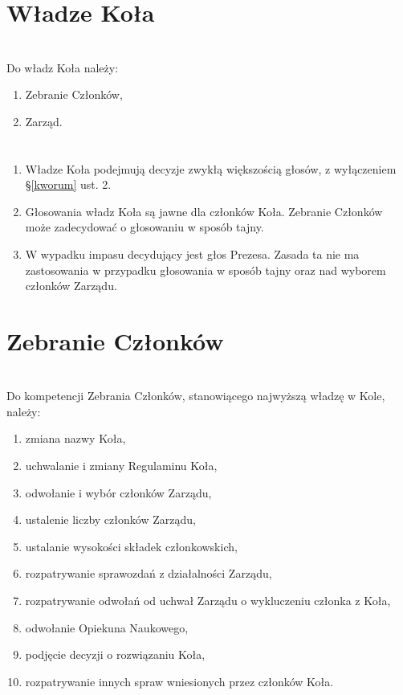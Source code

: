 \section*{Władze Koła~~~}
\section{}
Do władz Koła należy:
\begin{enumerate}[label=\alph*)]
\item Zebranie Członków,
\item Zarząd.
\end{enumerate}

\section{}
\begin{enumerate}
\item Władze Koła podejmują decyzje zwykłą większością głosów, z wyłączeniem \S \ref{kworum} ust. 2.
\item Głosowania władz Koła są jawne dla członków Koła. Zebranie Członków może zadecydować o głosowaniu w sposób tajny.
\item W wypadku impasu decydujący jest głos Prezesa. Zasada ta nie ma zastosowania w przypadku głosowania w sposób tajny oraz nad wyborem członków Zarządu.
\end{enumerate}

\section*{Zebranie Członków~~}
\section{}
Do kompetencji Zebrania Członków, stanowiącego najwyższą władzę w Kole, należy:
  \begin{enumerate}[label=\alph*)]
  \item zmiana nazwy Koła,
  \item uchwalanie i zmiany Regulaminu Koła,
  \item odwołanie i wybór członków Zarządu, 
  \item ustalenie liczby członków Zarządu,
  \item ustalanie wysokości składek członkowskich,
  \item rozpatrywanie sprawozdań z działalności Zarządu,
  \item rozpatrywanie odwołań od uchwał Zarządu o wykluczeniu członka z Koła,
  \item odwołanie Opiekuna Naukowego,
  \item podjęcie decyzji o rozwiązaniu Koła,
  \item rozpatrywanie innych spraw wniesionych przez członków Koła.
  \end{enumerate}

